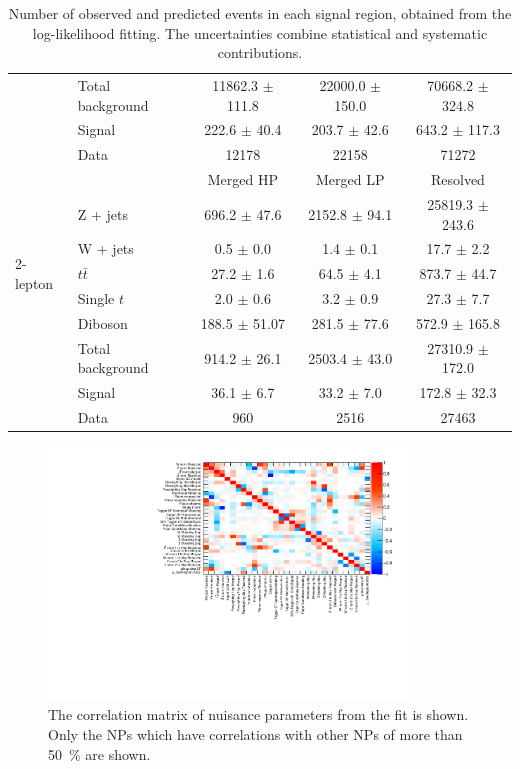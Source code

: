 \begin{table}[htbp]
\begin{center}
\begin{tabular}{| l | l | c | c | c |}
                   & Total background    & 11862.3 $\pm$ 111.8            &   22000.0 $\pm$ 150.0         & 70668.2 $\pm$ 324.8\\ \cline{2-5}
                   & Signal       & 222.6 $\pm$ 40.4           & 203.7 $\pm$ 42.6           &643.2 $\pm$ 117.3\\ \cline{2-5}
                   & Data         & 12178           & 22158           &71272\\ \hline \hline
\multirow{7}{*}{2-lepton} &     & Merged HP  & Merged LP               & Resolved  \\ \cline{2-5}
        & Z + jets    &  696.2 $\pm$ 47.6  & 2152.8 $\pm$ 94.1     & 25819.3 $\pm$ 243.6\\ 
        & W + jets    &  0.5 $\pm$ 0.0     & 1.4 $\pm$ 0.1         & 17.7 $\pm$ 2.2\\  
        & $t\bar{t}$  &  27.2 $\pm$ 1.6    & 64.5 $\pm$ 4.1        & 873.7 $\pm$ 44.7\\ 
        & Single $t$        &  2.0 $\pm$ 0.6     & 3.2 $\pm$ 0.9         & 27.3 $\pm$ 7.7\\ 
        & Diboson     &  188.5 $\pm$ 51.07  & 281.5 $\pm$ 77.6      & 572.9 $\pm$ 165.8\\ \cline{2-5}
        & Total background   &  914.2 $\pm$ 26.1  & 2503.4 $\pm$ 43.0  & 27310.9 $\pm$ 172.0\\ \cline{2-5}
        & Signal      &  36.1 $\pm$ 6.7    & 33.2 $\pm$ 7.0        & 172.8 $\pm$ 32.3\\ \cline{2-5}
        & Data        &  960                 & 2516                    & 27463\\ \hline 
\end{tabular}
\caption{\label{tab:postyields} Number of observed and predicted events in each signal region, obtained from the log-likelihood fitting. The uncertainties combine statistical and systematic contributions. }
\end{center}
\end{table}
\begin{figure}[]
    \centering
    \includegraphics[width=0.85\textwidth]{figures/fitresults/corr_HighCorrNoMCStat.pdf}
    \caption{The correlation matrix of nuisance parameters from the fit is shown. Only the NPs which have correlations with other NPs of more than 50~\% are shown.}
    \label{fig:correlation}
\end{figure}

